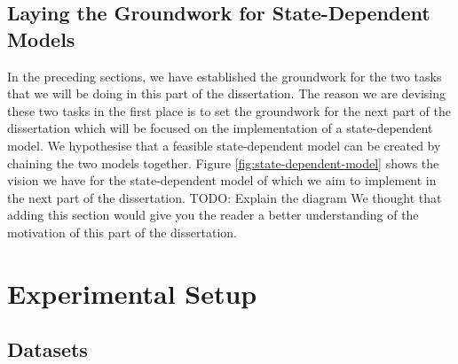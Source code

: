 \documentclass[logo,bsc,singlespacing,parskip,online]{infthesis}
\begin{document}
\section{Laying the Groundwork for State-Dependent Models}
In the preceding sections, we have established the groundwork for the two tasks that we will be doing in this part of the dissertation.
The reason we are devising these two tasks in the first place is to set the groundwork for the next part of the dissertation which 
will be focused on the implementation of a state-dependent model. We hypothesise that a feasible state-dependent model can be created 
by chaining the two models together. Figure \ref{fig:state-dependent-model} shows the vision we have for the state-dependent model 
of which we aim to implement in the next part of the dissertation.
TODO: Explain the diagram
We thought that adding this section would give you the reader a better understanding of the motivation of this part of the dissertation. 

\chapter{Experimental Setup}
\section{Datasets}
\label{sec:datasets}
\end{document}
